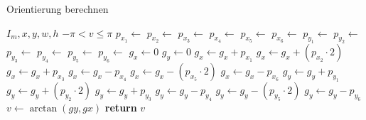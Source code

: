 \begin{algorithm}[ht]
\caption{Orientierung berechnen}
\label{alg:sobel}
\begin{algorithmic}[1]
	\Require $I_m, x, y, w, h$
	\Ensure $-\pi < v \leq \pi$
	\State $p_{x_1} \gets$ 
	\label{alg:sobel-readstart}
	\State $p_{x_2} \gets$ 
	\State $p_{x_3} \gets$ 
	\State $p_{x_4} \gets$ 
	\State $p_{x_5} \gets$ 
	\State $p_{x_6} \gets$ 
	\State $p_{y_1} \gets$ 
	\State $p_{y_2} \gets$ 
	\State $p_{y_3} \gets$ 
	\State $p_{y_4} \gets$ 
	\State $p_{y_5} \gets$ 
	\State $p_{y_6} \gets$ 
	\label{alg:sobel-readend}
	\State $g_x \gets 0$
	\State $g_y \gets 0$
	\State $g_x \gets g_x + p_{x_1}$
	\label{alg:sobel-convolutestart}
	\State $g_x \gets g_x + \left(p_{x_2} \cdot 2\right)$
	\State $g_x \gets g_x + p_{x_3}$
	\State $g_x \gets g_x - p_{x_4}$
	\State $g_x \gets g_x - \left(p_{x_5} \cdot 2\right)$
	\State $g_x \gets g_x - p_{x_6}$
	\State $g_y \gets g_y + p_{y_1}$
	\State $g_y \gets g_y + \left(p_{y_2} \cdot 2\right)$
	\State $g_y \gets g_y + p_{y_3}$
	\State $g_y \gets g_y - p_{y_4}$
	\State $g_y \gets g_y - \left(p_{y_5} \cdot 2\right)$
	\State $g_y \gets g_y - p_{y_6}$
	\label{alg:sobel-convoluteend}
	\State $v \gets \arctan{\left(gy, gx\right)}$
	\label{alg:sobel-arctan}
	\State \textbf{return} $v$
\end{algorithmic}
\end{algorithm}
